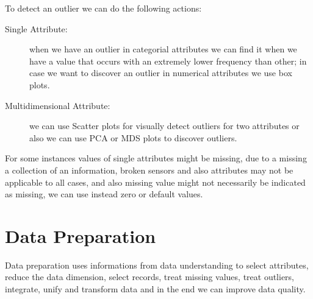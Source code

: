 To detect an outlier we can do the following actions:
\begin{description}
    \item [Single Attribute: ] when we have an outlier in categorial attributes we can find it when we have 
                               a value that occurs with an extremely lower frequency than other; in case we 
                               want to discover an outlier in numerical attributes we use box plots.
    \item [Multidimensional Attribute: ] we can use Scatter plots for visually detect outliers for two attributes or
                                         also we can use PCA or MDS plots to discover outliers.
\end{description}
For some instances values of single attributes might be missing, due to a missing a collection of an information,
broken sensors and also attributes may not be applicable to all cases, and also missing value might not
necessarily be indicated as missing, we can use instead zero or default values.

\section{Data Preparation}
Data preparation uses informations from data understanding to select attributes, reduce the data dimension,
select records, treat missing values, treat outliers, integrate, unify and transform data 
and in the end we can improve data quality.

